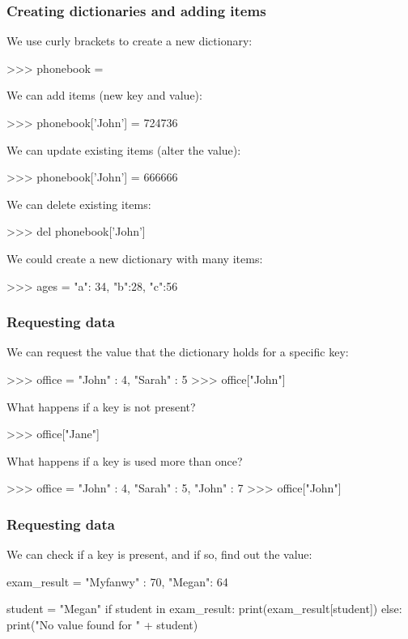 \documentclass{beamer}
\begin{document}
\begin{frame}[fragile]
\frametitle{Creating dictionaries and adding items}
We use curly brackets to create a new dictionary:
\begin{code}
>>> phonebook = {}
\end{code}

We can add items (new key and value):
\begin{code}
>>> phonebook['John'] = 724736
\end{code}

We can update existing items (alter the value):
\begin{code}
>>> phonebook['John'] = 666666
\end{code}

We can delete existing items:
\begin{code}
>>> del phonebook['John']
\end{code}

We could create a new dictionary with many items:
\begin{code}
>>> ages = { "a": 34, "b":28, "c":56 }
\end{code}
\end{frame}

\begin{frame}[fragile]
\frametitle{Requesting data}
We can request the value that the dictionary holds for a specific
key:
\begin{code}
>>> office = { "John" : 4, "Sarah" : 5 }
>>> office["John"]
\end{code}
 What happens if a key is not present?
\begin{code}
>>> office["Jane"]
\end{code}
 What happens if a key is used more than once?
\begin{code}
>>> office = { "John" : 4, "Sarah" : 5, "John" : 7 }
>>> office["John"]
\end{code}
\end{frame}


\begin{frame}[fragile]
\frametitle{Requesting data}
We can check if a key is present, and if so, find out the
value:
\begin{code}
exam_result = {"Myfanwy" : 70, "Megan": 64}

student = "Megan"
if student in exam_result:
   print(exam_result[student])
else:
   print("No value found for " + student)
\end{code}
\end{frame}
\end{document}

